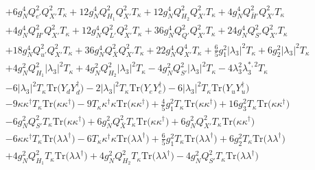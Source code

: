 {\begin{align}
 &+6 g_{N}^{4} Q_{e'}^{2} Q_{X'}^{2} T_{\kappa} +12 g_{N}^{4} Q_{H_1}^{2} Q_{X'}^{2} T_{\kappa} +12 g_{N}^{4} Q_{H_2}^{2} Q_{X'}^{2} T_{\kappa} +4 g_{N}^{4} Q_{\bar{H}'}^{2} Q_{X'}^{2} T_{\kappa} \nonumber \\ 
 &+4 g_{N}^{4} Q_{H'}^{2} Q_{X'}^{2} T_{\kappa} +12 g_{N}^{4} Q_{L'}^{2} Q_{X'}^{2} T_{\kappa} +36 g_{N}^{4} Q_{Q'}^{2} Q_{X'}^{2} T_{\kappa} +24 g_{N}^{4} Q_{S'}^{2} Q_{X'}^{2} T_{\kappa} \nonumber \\ 
 &+18 g_{N}^{4} Q_{u'}^{2} Q_{X'}^{2} T_{\kappa} +36 g_{N}^{4} Q_{\bar{X}}^{2} Q_{X'}^{2} T_{\kappa} +22 g_{N}^{4} Q_{X'}^{4} T_{\kappa} +\frac{6}{5} g_{1}^{2} |\lambda_3|^2 T_{\kappa} +6 g_{2}^{2} |\lambda_3|^2 T_{\kappa} \nonumber \\ 
 &+4 g_{N}^{2} Q_{H_1}^{2} |\lambda_3|^2 T_{\kappa} +4 g_{N}^{2} Q_{H_2}^{2} |\lambda_3|^2 T_{\kappa} -4 g_{N}^{2} Q_{S'}^{2} |\lambda_3|^2 T_{\kappa} -4 \lambda_{3}^{2} \lambda_{3}^{*,2} T_{\kappa} \nonumber \\ 
 &-6 |\lambda_3|^2 T_{\kappa} \mbox{Tr}\Big({Y_d  Y_{d}^{\dagger}}\Big) -2 |\lambda_3|^2 T_{\kappa} \mbox{Tr}\Big({Y_e  Y_{e}^{\dagger}}\Big) -6 |\lambda_3|^2 T_{\kappa} \mbox{Tr}\Big({Y_u  Y_{u}^{\dagger}}\Big) \nonumber \\ 
 &-9 {\kappa  \kappa^{\dagger}  T_{\kappa}} \mbox{Tr}\Big({\kappa  \kappa^{\dagger}}\Big) -9 {T_{\kappa}  \kappa^{\dagger}  \kappa} \mbox{Tr}\Big({\kappa  \kappa^{\dagger}}\Big) +\frac{4}{5} g_{1}^{2} T_{\kappa} \mbox{Tr}\Big({\kappa  \kappa^{\dagger}}\Big) +16 g_{3}^{2} T_{\kappa} \mbox{Tr}\Big({\kappa  \kappa^{\dagger}}\Big) \nonumber \\ 
 &-6 g_{N}^{2} Q_{S'}^{2} T_{\kappa} \mbox{Tr}\Big({\kappa  \kappa^{\dagger}}\Big) +6 g_{N}^{2} Q_{\bar{X}}^{2} T_{\kappa} \mbox{Tr}\Big({\kappa  \kappa^{\dagger}}\Big) +6 g_{N}^{2} Q_{X'}^{2} T_{\kappa} \mbox{Tr}\Big({\kappa  \kappa^{\dagger}}\Big) \nonumber \\ 
 &-6 {\kappa  \kappa^{\dagger}  T_{\kappa}} \mbox{Tr}\Big({\lambda  \lambda^{\dagger}}\Big) -6 {T_{\kappa}  \kappa^{\dagger}  \kappa} \mbox{Tr}\Big({\lambda  \lambda^{\dagger}}\Big) +\frac{6}{5} g_{1}^{2} T_{\kappa} \mbox{Tr}\Big({\lambda  \lambda^{\dagger}}\Big) +6 g_{2}^{2} T_{\kappa} \mbox{Tr}\Big({\lambda  \lambda^{\dagger}}\Big) \nonumber \\ 
 &+4 g_{N}^{2} Q_{H_1}^{2} T_{\kappa} \mbox{Tr}\Big({\lambda  \lambda^{\dagger}}\Big) +4 g_{N}^{2} Q_{H_2}^{2} T_{\kappa} \mbox{Tr}\Big({\lambda  \lambda^{\dagger}}\Big) -4 g_{N}^{2} Q_{S'}^{2} T_{\kappa} \mbox{Tr}\Big({\lambda  \lambda^{\dagger}}\Big) \nonumber \\ 

\end{align}}
